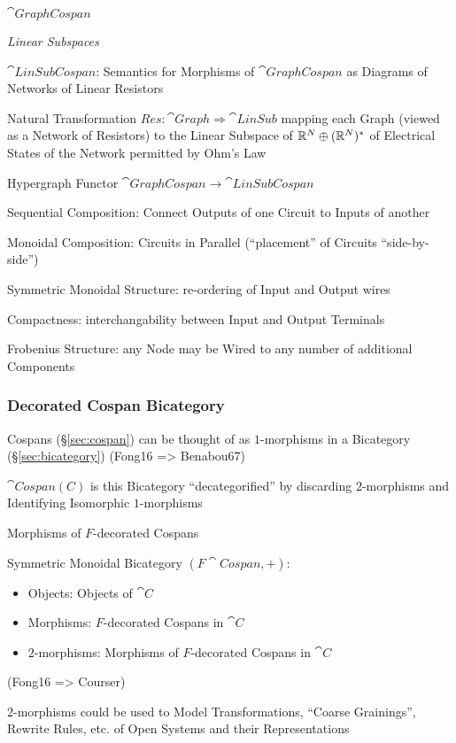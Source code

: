 $\cat{GraphCospan}$


\emph{Linear Subspaces}

$\cat{LinSubCospan}$: Semantics for Morphisms of $\cat{GraphCospan}$
as Diagrams of Networks of Linear Resistors

Natural Transformation $Res : \cat{Graph} \Rightarrow \cat{LinSub}$
mapping each Graph (viewed as a Network of Resistors) to the Linear
Subspace of $\mathbb{R}^N \oplus (\mathbb{R}^N)^*$ of Electrical States of the
Network permitted by Ohm's Law

Hypergraph Functor $\cat{GraphCospan} \rightarrow \cat{LinSubCospan}$

Sequential Composition: Connect Outputs of one Circuit to Inputs of
another

Monoidal Composition: Circuits in Parallel (``placement'' of Circuits
``side-by-side'')

Symmetric Monoidal Structure: re-ordering of Input and Output wires

Compactness: interchangability between Input and Output Terminals

Frobenius Structure: any Node may be Wired to any number of additional
Components



\subsubsection{Decorated Cospan Bicategory}
\label{sec:decorated_cospan_bicategory}

Cospans (\S\ref{sec:cospan}) can be thought of as $1$-morphisms in a
Bicategory (\S\ref{sec:bicategory}) (Fong16 => Benabou67)

$\cat{Cospan(C)}$ is this Bicategory ``decategorified'' by discarding
$2$-morphisms and Identifying Isomorphic $1$-morphisms

Morphisms of $F$-decorated Cospans

Symmetric Monoidal Bicategory $(F\cat{Cospan}, +)$:
\begin{itemize}
  \item Objects: Objects of $\cat{C}$
  \item Morphisms: $F$-decorated Cospans in $\cat{C}$
  \item $2$-morphisms: Morphisms of $F$-decorated Cospans in $\cat{C}$
\end{itemize}

(Fong16 => Courser)

$2$-morphisms could be used to Model Transformations, ``Coarse
Grainings'', Rewrite Rules, etc. of Open Systems and their
Representations



